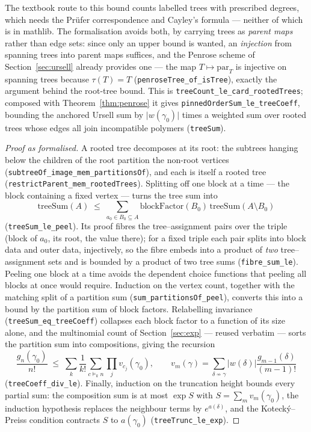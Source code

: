 \documentclass[11pt]{amsart}
\begin{document}
The textbook route to this bound counts labelled trees with prescribed
degrees, which needs the Prüfer correspondence and Cayley's formula —
neither of which is in \textsf{mathlib}. The formalisation avoids both,
by carrying trees as \emph{parent maps} rather than edge sets: since
only an upper bound is wanted, an \emph{injection} from spanning trees
into parent maps suffices, and the Penrose scheme of
Section~\ref{sec:ursell} already provides one — the map $T \mapsto
\mathrm{par}_T$ is injective on spanning trees because
$\tau(T) = T$ (\texttt{penroseTree\_of\_isTree}), exactly the argument
behind the root-tree bound. This is \texttt{treeCount\_le\_card\_rootedTrees};
composed with Theorem~\ref{thm:penrose} it gives
\texttt{pinnedOrderSum\_le\_treeCoeff}, bounding the anchored Ursell sum
by $\lvert w(\gamma_0)\rvert$ times a weighted sum over rooted trees
whose edges all join incompatible polymers (\texttt{treeSum}).

\begin{proof}[Proof as formalised]
A rooted tree decomposes at its root: the subtrees hanging below the
children of the root partition the non-root vertices
(\texttt{subtreeOf\_image\_mem\_partitionsOf}), and each is itself a
rooted tree (\texttt{restrictParent\_mem\_rootedTrees}). Splitting off
one block at a time — the block containing a fixed vertex — turns the
tree sum into
\[
  \mathrm{treeSum}(A) \;\le\; \sum_{a_0 \in B_0 \subseteq A}
  \mathrm{blockFactor}(B_0)\, \mathrm{treeSum}(A \setminus B_0)
\]
(\texttt{treeSum\_le\_peel}). Its proof fibres the tree--assignment
pairs over the triple (block of $a_0$, its root, the value there); for a
fixed triple each pair splits into block data and outer data, injectively,
so the fibre embeds into a product of \emph{two} tree--assignment sets
and is bounded by a product of two tree sums (\texttt{fibre\_sum\_le}).
Peeling one block at a time avoids the dependent choice functions that
peeling all blocks at once would require. Induction on the vertex count,
together with the matching split of a partition sum
(\texttt{sum\_partitionsOf\_peel}), converts this into a bound by the
partition sum of block factors. Relabelling invariance
(\texttt{treeSum\_eq\_treeCoeff}) collapses each block factor to a
function of its size alone, and the multinomial count of
Section~\ref{sec:exp} — reused verbatim — sorts the partition sum into
compositions, giving the recursion
\[
  \frac{g_n(\gamma_0)}{n!} \;\le\; \sum_k \frac{1}{k!}
  \sum_{c \vDash_k n} \prod_j v_{c_j}(\gamma_0),
  \qquad
  v_m(\gamma) = \sum_{\delta \nsim \gamma} \lvert w(\delta)\rvert
  \frac{g_{m-1}(\delta)}{(m-1)!}
\]
(\texttt{treeCoeff\_div\_le}). Finally, induction on the truncation
height bounds every partial sum: the composition sum is at most
$\exp S$ with $S = \sum_m v_m(\gamma_0)$, the induction hypothesis
replaces the neighbour terms by $e^{a(\delta)}$, and the Kotecký--Preiss
condition contracts $S$ to $a(\gamma_0)$
(\texttt{treeTrunc\_le\_exp}).
\end{proof}
\end{document}
